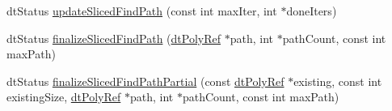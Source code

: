 \begin{Indent}
\begin{DoxyCompactItemize}
\item 
dt\+Status \hyperlink{classdtNavMeshQuery_aa0c147e3da7fd0b59342da0fc456afc7}{update\+Sliced\+Find\+Path} (const int max\+Iter, int $\ast$done\+Iters)
\item 
dt\+Status \hyperlink{classdtNavMeshQuery_a98673bb238fbb139ec8407e266fa76fd}{finalize\+Sliced\+Find\+Path} (\hyperlink{group__detour_gab4e0b2257a670c1a800057999612b466}{dt\+Poly\+Ref} $\ast$path, int $\ast$path\+Count, const int max\+Path)
\item 
dt\+Status \hyperlink{classdtNavMeshQuery_a01b18dcb5d25fc392b6030ae5d4f310e}{finalize\+Sliced\+Find\+Path\+Partial} (const \hyperlink{group__detour_gab4e0b2257a670c1a800057999612b466}{dt\+Poly\+Ref} $\ast$existing, const int existing\+Size, \hyperlink{group__detour_gab4e0b2257a670c1a800057999612b466}{dt\+Poly\+Ref} $\ast$path, int $\ast$path\+Count, const int max\+Path)
\end{DoxyCompactItemize}
\end{Indent}
